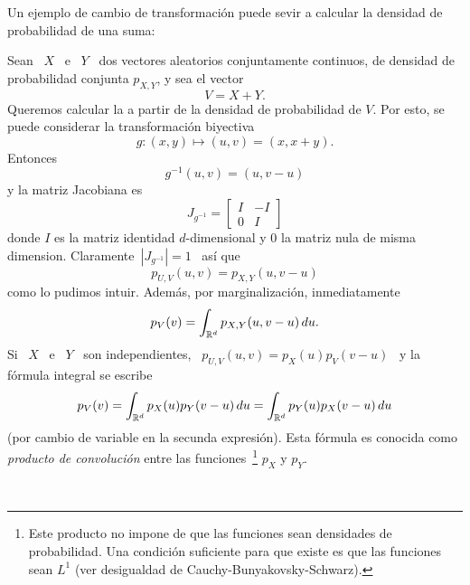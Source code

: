 Un ejemplo de  cambio de transformaci\'on puede sevir a  calcular la densidad de
probabilidad de una suma:
%
\begin{ejemplo}\label{Ej:MP:Suma}
  Sean \  $X$ \ e  \ $Y$ \  dos vectores aleatorios conjuntamente  continuos, de
  densidad de  probabilidad conjunta $p_{X,Y}$,  y sea el  vector \[V = X  + Y.\]
  Queremos calcular la a partir de la densidad de probabilidad de $V$.  Por esto,
  se puede considerar la transformaci\'on biyectiva
  \[
  g: (x,y) \mapsto (u,v) = (x,x+y).
  \]
  Entonces
  \[
  g^{-1}(u,v) = (u,v-u)
  \]
  y la matriz Jacobiana es
  \[
  J_{g^{-1}} = \begin{bmatrix} I & -I \\ 0 & I \end{bmatrix}
  \]
  donde $I$ es la matriz identidad $d$-dimensional y $0$ la matriz nula de misma
  dimension. Claramente\ $\left| J_{g^{-1}} \right| = 1$ \ as\'i que
  \[
  p_{U,V}(u,v) = p_{X,Y}(u,v-u)
  \]
  como lo pudimos intuir. Adem\'as, por marginalizaci\'on, inmediatamente
  \[
  p_V(v) = \int_{\mathbb{R}^d} p_{X,Y}(u,v-u) \, du.
  \]
  Si \ $X$ \ e \ $Y$  \ son independientes, \ $p_{U,V}(u,v) = p_X(u) p_V(v-u)$ \
  y la f\'ormula integral se escribe
  \[
  p_V(v) = \int_{\mathbb{R}^d} p_X(u) p_Y(v-u) \, du = \int_{\mathbb{R}^d} p_Y(u) p_X(v-u)
  \, du
  \]
  (por  cambio  de variable  en  la  secunda  expresi\'on).  Esta  f\'ormula  es
  conocida    como     {\it    producto    de     convoluci\'on}    entre    las
  funciones~\footnote{Este  producto  no  impone   de  que  las  funciones  sean
    densidades de  probabilidad.  Una condici\'on suficiente para  que existe es
    que     las     funciones     sean     $L^1$     (ver     desigualdad     de
    Cauchy-Bunyakovsky-Schwarz).} $p_X$ y $p_Y$.
\end{ejemplo}




\




